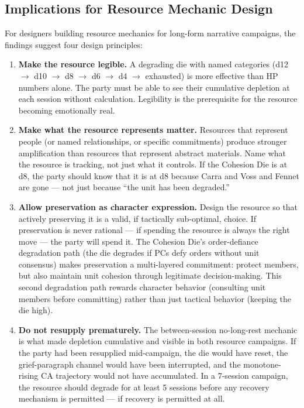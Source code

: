 \subsection{Implications for Resource Mechanic Design}

For designers building resource mechanics for long-form narrative campaigns, the
findings suggest four design principles:

\begin{enumerate}
  \item \textbf{Make the resource legible.} A degrading die with named categories
    (d12 $\to$ d10 $\to$ d8 $\to$ d6 $\to$ d4 $\to$ exhausted) is more effective than
    HP numbers alone. The party must be able to see their cumulative depletion at each
    session without calculation. Legibility is the prerequisite for the resource becoming
    emotionally real.

  \item \textbf{Make what the resource represents matter.} Resources that represent
    people (or named relationships, or specific commitments) produce stronger amplification
    than resources that represent abstract materials. Name what the resource is tracking,
    not just what it controls. If the Cohesion Die is at d8, the party should know that
    it is at d8 because Carra and Voss and Fennet are gone --- not just because ``the
    unit has been degraded.''

  \item \textbf{Allow preservation as character expression.} Design the resource so
    that actively preserving it is a valid, if tactically sub-optimal, choice. If
    preservation is never rational --- if spending the resource is always the right
    move --- the party will spend it. The Cohesion Die's order-defiance degradation
    path (the die degrades if PCs defy orders without unit consensus) makes preservation
    a multi-layered commitment: protect members, but also maintain unit cohesion through
    legitimate decision-making. This second degradation path rewards character behavior
    (consulting unit members before committing) rather than just tactical behavior
    (keeping the die high).

  \item \textbf{Do not resupply prematurely.} The between-session no-long-rest mechanic
    is what made depletion cumulative and visible in both resource campaigns. If the
    party had been resupplied mid-campaign, the die would have reset, the grief-paragraph
    channel would have been interrupted, and the monotone-rising CA trajectory would not
    have accumulated. In a 7-session campaign, the resource should degrade for at least
    5 sessions before any recovery mechanism is permitted --- if recovery is permitted
    at all.
\end{enumerate}

